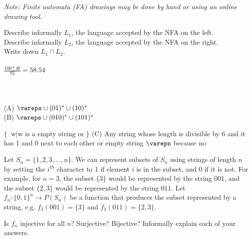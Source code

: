 \documentclass[solution, letterpaper]{cs121}
\begin{document}
\textit{Note: Finite automata (FA) drawings may be done by hand or using an online drawing tool.}


\subproblem Describe informally $L_1$, the language accepted by the NFA on the left.\\
\subproblem Describe informally $L_2$, the language accepted by the NFA on the right.\\
\subproblem Write down $L_1 \cap L_2$.
\\\\
$\frac{100*48}{82}=58.54$
\\\\\\
\\\noindent 
{(A) } $\vareps \cup (01)^* \cup (10)^*$  
\\\noindent 
{(B) } $\vareps \cup (010)^* \cup (101)^*$  

$ \{\ { \text{ w} | \text{w is a empty string or }  } \} $
{(C) } Any string whose length is divisible by 6 and  it has 1 and 0 next to each other or empty string
$\vareps$ because no  

\pagebreak

Let $S_n = \{1, 2, 3, ..., n\}$. We can represent subsets of $S_n$ using strings of length $n$ by setting the $i^{th}$ character to 1 if element $i$ is in the subset, and 0 if it is not. For example, for $n = 3$, the subset $\{3\}$ would be represented by the string $001$, and the subset $\{2, 3\}$ would be represented by the string $011$. Let $f_n : \{0, 1\}^n \to P(S_n) $ be a function that produces the subset represented by a string, e.g. $f_3(001) = \{3\}$ and $f_3(011) = \{2, 3\}$.

\subproblem Is $f_n$ injective for all $n$? Surjective? Bijective? Informally explain each of your answers.
\end{document}
